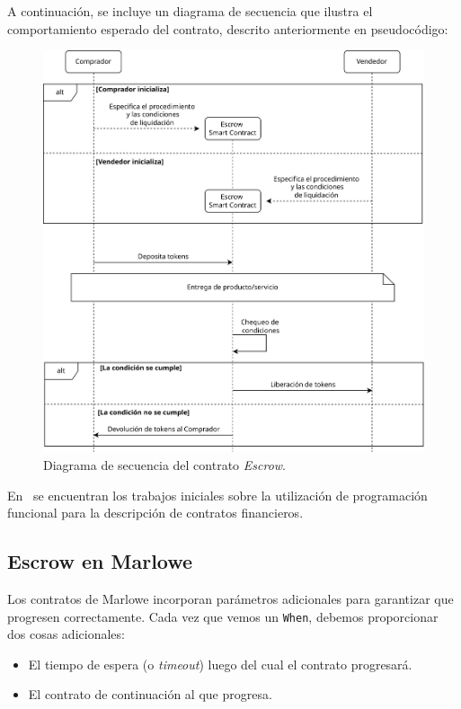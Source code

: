 \documentclass[12pt]{book}
\begin{document}
A continuación, se incluye un diagrama de secuencia que ilustra el comportamiento esperado del contrato, descrito anteriormente en pseudocódigo:

\begin{figure}[H]
    \centering
    \includegraphics[width=\textwidth]{Escrow.png}
    \caption{Diagrama de secuencia del contrato \textit{Escrow}.}\label{fig:Escrow}
\end{figure}

En~\cite{composing-contracts, multi-party-contracts} se encuentran los trabajos iniciales sobre la utilización de programación funcional para la descripción de contratos financieros.

\subsection{Escrow en Marlowe}

Los contratos de Marlowe incorporan parámetros adicionales para garantizar que progresen correctamente. Cada vez que vemos un \texttt{When}, debemos proporcionar dos cosas adicionales:

\begin{itemize}
    \item El tiempo de espera (o \textit{timeout}) luego del cual el contrato progresará.
    \item El contrato de continuación al que progresa.
\end{itemize}
\end{document}
